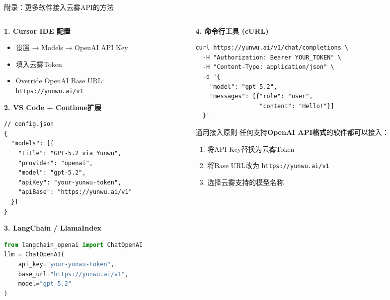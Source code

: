 \documentclass[aspectratio=169,11pt]{beamer}
\begin{document}
\begin{frame}[fragile]{附录：更多软件接入云雾API的方法}
    \begin{columns}
        \begin{column}{0.5\textwidth}
            \textbf{1. Cursor IDE 配置}
            \begin{itemize}
                \item 设置 → Models → OpenAI API Key
                \item 填入云雾Token
                \item Override OpenAI Base URL:\\
                    \texttt{https://yunwu.ai/v1}
            \end{itemize}
            
            \vspace{0.3cm}
            \textbf{2. VS Code + Continue扩展}
            \begin{lstlisting}[basicstyle=\ttfamily\tiny]
// config.json
{
  "models": [{
    "title": "GPT-5.2 via Yunwu",
    "provider": "openai",
    "model": "gpt-5.2",
    "apiKey": "your-yunwu-token",
    "apiBase": "https://yunwu.ai/v1"
  }]
}
            \end{lstlisting}
            
            \vspace{0.3cm}
            \textbf{3. LangChain / LlamaIndex}
            \begin{lstlisting}[language=Python,basicstyle=\ttfamily\tiny]
from langchain_openai import ChatOpenAI
llm = ChatOpenAI(
    api_key="your-yunwu-token",
    base_url="https://yunwu.ai/v1",
    model="gpt-5.2"
)
            \end{lstlisting}
        \end{column}
        \begin{column}{0.5\textwidth}
            \textbf{4. 命令行工具 (cURL)}
            \begin{lstlisting}[basicstyle=\ttfamily\tiny]
curl https://yunwu.ai/v1/chat/completions \
  -H "Authorization: Bearer YOUR_TOKEN" \
  -H "Content-Type: application/json" \
  -d '{
    "model": "gpt-5.2",
    "messages": [{"role": "user", 
                  "content": "Hello!"}]
  }'
            \end{lstlisting}
            
            \vspace{0.3cm}
            \begin{block}{通用接入原则}
                任何支持\textbf{OpenAI API格式}的软件都可以接入：
                \begin{enumerate}
                    \item 将API Key替换为云雾Token
                    \item 将Base URL改为 \texttt{https://yunwu.ai/v1}
                    \item 选择云雾支持的模型名称
                \end{enumerate}
            \end{block}
            

\end{column}
\end{columns}
\end{frame}
\end{document}

